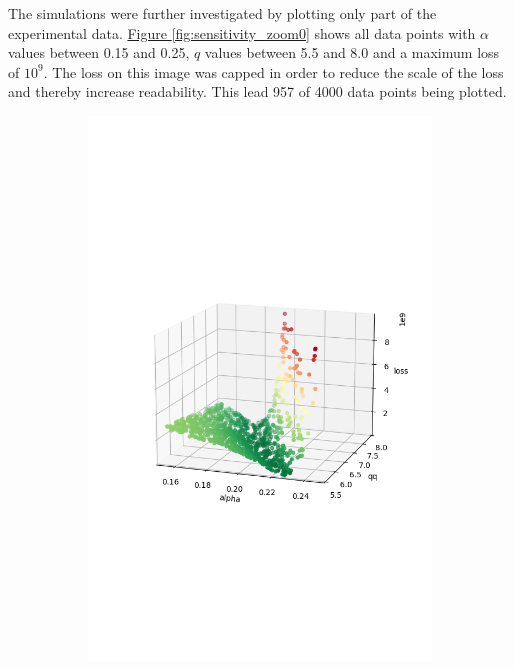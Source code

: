 The simulations were further investigated by plotting only part of the experimental data.
\hyperref[fig:sensitivity_zoom0]{Figure \ref*{fig:sensitivity_zoom0}} shows all data points with $\alpha$ values between 0.15
and 0.25, $q$ values between 5.5 and 8.0 and a maximum loss of $10^{9}$. The loss on this image was capped in order to reduce
the scale of the loss and thereby increase readability. This lead 957 of 4000 data points being plotted.

\begin{figure}
	\centering
	\begin{subfigure}[b]{0.4\textwidth}
		\centering
		\includegraphics[width=\textwidth]{./figures/sensitivity/sensitivity_zoom1_0.png}	

\end{subfigure}
\end{figure}

